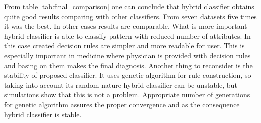 From table \ref{tab:final_comparison} one can conclude that hybrid classifier
obtains quite good results comparing with other classifiers. From seven
datasets five times it was the best. In other cases results are comparable.
What is more important hybrid classifier is able to classify pattern with
reduced number of attributes. In this case created decision rules are simpler
and more readable for user. This is especially important in medicine where
physician is provided with decision rules and basing on them makes the final
diagnosis. Another thing to reconsider is the stability of proposed classifier.
It uses genetic algorithm for rule construction, so taking into account its
random nature hybrid classifier can be unstable, but simulations show that this
is not a problem. Appropriate number of generations for genetic algorithm
assures the proper convergence and as the consequence hybrid classifier is stable. 
